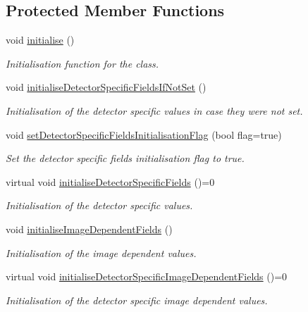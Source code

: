 \subsection*{\-Protected \-Member \-Functions}
\begin{DoxyCompactItemize}
\item 
void \hyperlink{classmultiscale_1_1analysis_1_1Detector_ae9be577bb23f9472d8ca3e19519764f8}{initialise} ()
\begin{DoxyCompactList}\small\item\em \-Initialisation function for the class. \end{DoxyCompactList}\item 
void \hyperlink{classmultiscale_1_1analysis_1_1Detector_a9636effe77eabf614210dbb079c18bf0}{initialise\-Detector\-Specific\-Fields\-If\-Not\-Set} ()
\begin{DoxyCompactList}\small\item\em \-Initialisation of the detector specific values in case they were not set. \end{DoxyCompactList}\item 
void \hyperlink{classmultiscale_1_1analysis_1_1Detector_a610c16fdecd543f15575f0effb08ff00}{set\-Detector\-Specific\-Fields\-Initialisation\-Flag} (bool flag=true)
\begin{DoxyCompactList}\small\item\em \-Set the detector specific fields initialisation flag to true. \end{DoxyCompactList}\item 
virtual void \hyperlink{classmultiscale_1_1analysis_1_1Detector_a83aea2a1b70e54d08cf3b0514c780796}{initialise\-Detector\-Specific\-Fields} ()=0
\begin{DoxyCompactList}\small\item\em \-Initialisation of the detector specific values. \end{DoxyCompactList}\item 
void \hyperlink{classmultiscale_1_1analysis_1_1Detector_aa99821e2690a7776a598b3a5c1cd3d5d}{initialise\-Image\-Dependent\-Fields} ()
\begin{DoxyCompactList}\small\item\em \-Initialisation of the image dependent values. \end{DoxyCompactList}\item 
virtual void \hyperlink{classmultiscale_1_1analysis_1_1Detector_ab511a3cbe1766a33cb24f61c6fff7253}{initialise\-Detector\-Specific\-Image\-Dependent\-Fields} ()=0
\begin{DoxyCompactList}\small\item\em \-Initialisation of the detector specific image dependent values. \end{DoxyCompactList}\item 

\end{DoxyCompactItemize}
